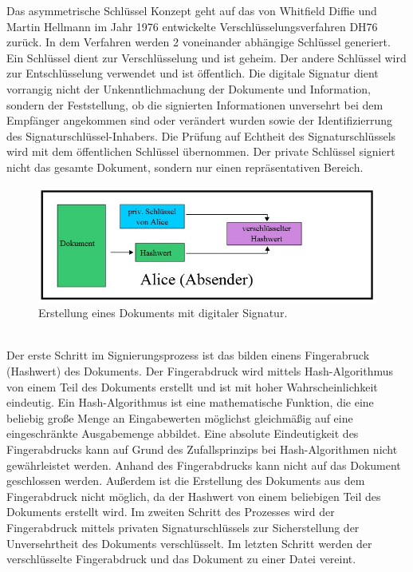 Das asymmetrische Schlüssel Konzept geht auf das von Whitfield Diffie und Martin Hellmann im Jahr 1976 entwickelte Verschlüsselungsverfahren DH76 zurück. In dem Verfahren werden 2 voneinander abhängige Schlüssel generiert. Ein Schlüssel dient zur Verschlüsselung und ist geheim. Der andere Schlüssel wird zur Entschlüsselung verwendet und ist öffentlich. Die digitale Signatur dient vorrangig nicht der Unkenntlichmachung der Dokumente und Information, sondern der Feststellung, ob die signierten Informationen unversehrt bei dem Empfänger angekommen sind oder verändert wurden sowie der Identifizierrung des Signaturschlüssel-Inhabers. Die Prüfung auf Echtheit des Signaturschlüssels wird mit dem öffentlichen Schlüssel übernommen. Der private Schlüssel signiert nicht das gesamte Dokument, sondern nur einen repräsentativen Bereich. \cite{techno1}
\begin{figure}[!ht]
    \centering
    \includegraphics[width=\textwidth]{ErstellungAbsender2.jpg}
    \caption[Erstellung eines Dokuments mit digitaler Signatur]{\small{Erstellung eines Dokuments mit digitaler Signatur. \cite{techno3}}}
    \label{fig:2}
\end{figure}\\
Der erste Schritt im Signierungsprozess ist das bilden einens Fingerabruck (Hashwert) des Dokuments. Der Fingerabdruck wird mittels Hash-Algorithmus von einem Teil des Dokuments erstellt und ist mit hoher Wahrscheinlichkeit eindeutig. Ein Hash-Algorithmus ist eine mathematische Funktion, die eine beliebig große Menge an Eingabewerten möglichst gleichmäßig auf eine eingeschränkte Ausgabemenge abbildet. \cite{techno2} Eine absolute Eindeutigkeit des Fingerabdrucks kann auf Grund des Zufallsprinzips bei Hash-Algorithmen nicht gewährleistet werden. Anhand des Fingerabdrucks kann nicht auf das Dokument geschlossen werden. Außerdem ist die Erstellung des Dokuments aus dem Fingerabdruck nicht möglich, da der Hashwert von einem beliebigen Teil des Dokuments erstellt wird. Im zweiten Schritt des Prozesses wird der Fingerabdruck mittels privaten Signaturschlüssels zur Sicherstellung der Unversehrtheit des Dokuments verschlüsselt. Im letzten Schritt werden der verschlüsselte Fingerabdruck und das Dokument zu einer Datei vereint. \cite{techno1}   